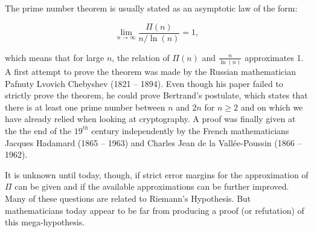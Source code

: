 \documentclass{scrreprt}
\begin{document}
The prime number theorem is usually stated
as an asymptotic law of the form:

\begin{equation}
\lim_{n \to \infty} \frac{\Pi(n)}{n/\ln(n)} = 1,
\end{equation}

which means that for large $n$,
the relation of $\Pi(n)$ and $\frac{n}{\ln(n)}$
approximates 1.
A first attempt to prove the theorem
was made by the Russian mathematician 
Pafnuty Lvovich Chebyshev (1821 -- 1894).
Even though his paper failed to strictly prove
the theorem, he could prove Bertrand's postulate,
which states that there is at least one prime number
between $n$ and $2n$ for $n \ge 2$
and on which we have already relied
when looking at cryptography.
A proof was finally given at the the end
of the $19^{th}$ century 
independently by the French mathematicians
Jacques Hadamard (1865 -- 1963) and
Charles Jean de la Vallée-Poussin (1866 -- 1962).

It is unknown until today, though,
if strict error margins for the approximation
of $\Pi$ can be given and if the available
approximations can be further improved.
Many of these questions are related to
Riemann's Hypothesis. 
But mathematicians today appear to be far
from producing a proof (or refutation) of
this mega-hypothesis.
\end{document}
